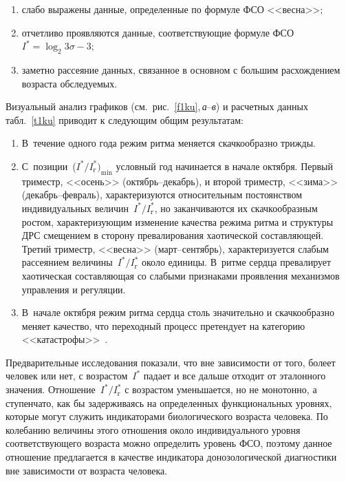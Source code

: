 \begin{multicols}{2}
\noindent
  \begin{enumerate}[(1)]
  \item
   слабо выражены данные, определенные по формуле ФСО <<весна>>; 
  \item  отчетливо проявляются данные, соответст\-ву\-ющие формуле ФСО $I^* = 
\log_2 3\sigma - 3$; 
  \item заметно рассеяние данных, связанное в основном с большим 
расхождением возраста обследуемых.
  \end{enumerate}
  
  Визуальный анализ графиков (см.\ рис.~\ref{f1ku},\,\textit{а}--\textit{в})\linebreak 
и расчетных данных табл.~\ref{t1ku} приводит к следующим общим 
результатам: 
  \begin{enumerate}[1.]
  \item В~течение одного года режим ритма меняется скачкообразно трижды. 
  \item С~позиции~($I^*/I_{\mathrm{г}}^*)_{\min}$ условный год начинается в 
начале октября. Первый триместр, <<осень>> (октябрь--декабрь), и второй 
триместр, <<зима>>\linebreak (декабрь--февраль), характеризуются относительным 
постоянством индивидуальных величин~$I^*/I_{\mathrm{г}}^*$, но 
заканчиваются их скачко\-об\-разным ростом, характеризующим изменение\linebreak 
качества режима ритма и структуры ДРС смещением в сторону превалирования 
хаотической составляющей. Третий триместр, <<весна>> (март--сентябрь), 
характеризуется слабым рассеянием величины~$I^*/I_{\mathrm{г}}^*$ около 
единицы. В~ритме сердца превалирует хаотическая со\-став\-ля\-ющая со слабыми 
признаками проявления механизмов управления и регуляции. 
  \item  В~начале октября режим ритма сердца столь значительно и 
скачкообразно меняет качество, что переходный процесс претендует на 
категорию <<катастрофы>>~\cite{30ku}.
  \end{enumerate}
  
  Предварительные исследования показали, что вне зависимости от того, 
болеет человек или нет, с возрастом~$I^*$ падает и все дальше отходит от 
эталонного значения. Отношение~$I^*/I_{\mathrm{г}}^*$ с возрастом 
уменьшается, но не монотонно, а ступенчато, как бы задерживаясь на 
определенных функциональных уровнях, которые могут служить индикаторами 
биологического возраста человека. По колебанию величины этого отношения 
около индивидуального уровня соответствующего возраста можно определить 
уровень ФСО, поэтому данное отношение предлагается в качестве индикатора 
донозологической диагностики вне зависимости от возраста человека.
  

\end{multicols}
